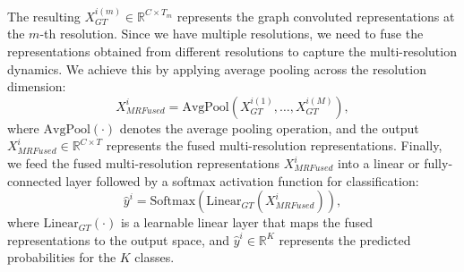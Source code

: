 The resulting ${X}^{i(m)}_{GT} \in \mathbb{R}^{C \times T_m}$ represents the graph convoluted representations at the $m$-th resolution.
Since we have multiple resolutions, we need to fuse the representations obtained from different resolutions to capture the multi-resolution dynamics. We achieve this by applying average pooling  across the resolution dimension:
\begin{equation}
{X}^{i}_{MRFused} = \text{AvgPool}({{X}^{i(1)}_{GT}, \ldots, {X}^{i(M)}_{GT}}),
\end{equation}
where $\text{AvgPool}(\cdot)$ denotes the average pooling operation, and the output ${X}^{i}_{MRFused} \in \mathbb{R}^{C \times T}$ represents the fused multi-resolution representations.
Finally, we feed the fused multi-resolution representations ${X}^{i}_{MRFused}$ into a linear or fully-connected layer followed by a softmax activation function for classification:
\begin{equation}
\hat{{y}}^{i} = \text{Softmax}(\text{Linear}_{GT}({X}^{i}_{MRFused})),
\end{equation}
where $\text{Linear}_{GT}(\cdot)$ is a learnable linear layer that maps the fused representations to the output space, and $\hat{{y}}^{i} \in \mathbb{R}^{K}$ represents the predicted probabilities for the $K$ classes.

\iffalse
